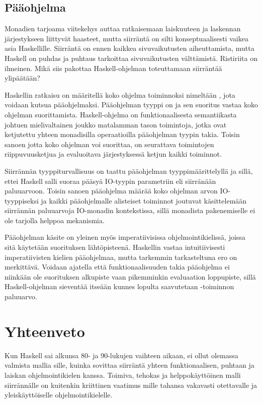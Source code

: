 \documentclass[finnish]{tktltiki2}
\begin{document}
\subsection{Pääohjelma} %

Monadien tarjoama viitekehys auttaa ratkaisemaan laiskuuteen ja laskennan järjestykseen liittyvät
haasteet, mutta siirräntä on silti konseptuaalisesti vaikea asia Haskellille. Siirräntä on ennen
kaikkea sivuvaikutusten aiheuttamista, mutta Haskell on puhdas ja puhtaus tarkoittaa sivuvaikutusten
välttämistä. Ristiriita on ilmeinen. Mikä siis pakottaa Haskell-ohjelman toteuttamaan siirräntää
ylipäätään?

Haskellin ratkaisu on määritellä koko ohjelma toiminnoksi nimeltään , jota voidaan kutsua
pääohjelmaksi. Pääohjelman tyyppi on  ja sen suoritus vastaa koko ohjelman
suorittamista. Haskell-ohjelma on funktionaalisesta semantiikasta johtuen mielivaltainen joukko
matalamman tason toimintoja, jotka ovat ketjutettu yhteen monadisilla operaatioilla pääohjelman
tyypin takia. Toisin sanoen jotta koko ohjelman voi suorittaa, on seurattava toimintojen
riippuvuusketjua ja evaluoitava järjestyksessä ketjun kaikki toiminnot.

Siirrännän tyyppiturvallisuus on taattu pääohjelman tyyppimäärittelyllä ja sillä, ettei Haskell
salli suoraa pääsyä IO-tyypin parametriin eli siirränään paluuarvoon. Toisin sanoen pääohjelma
määrää koko ohjelman arvon IO-tyyppiseksi ja kaikki pääohjelmalle alisteiset toiminnot joutuvat
käsittelemään siirrännän paluuarvoja IO-monadin kontekstissa, sillä monadista pakenemiselle ei ole
tarjolla helppoa mekanismia.

Pääohjelman käsite on yleinen myös imperatiivisissa ohjelmointikielissä, joissa sitä käytetään
suorituksen lähtöpisteenä. Haskellin  vastaa intuitiivisesti imperatiivisten kielien
pääohjelmaa, mutta tarkemmin tarkasteltuna ero on merkittävä. Voidaan ajatella että
funktionaalisuuden takia pääohjelma ei niinkään ole suorituksen alkupiste vaan pikemminkin
evaluaation loppupiste, sillä Haskell-ohjelman sieventää itseään kunnes lopulta saavutetaan
-toiminnon paluuarvo.


\section{Yhteenveto}

Kun Haskell sai alkunsa 80- ja 90-lukujen vaihteen aikaan, ei ollut olemassa valmista mallia sille,
kuinka sovittaa siirräntä yhteen funktionaalisen, puhtaan ja laiskan ohjelmointikielen kanssa.
Toimiva, tehokas ja helppokäyttöinen malli siirrännälle on kuitenkin kriittinen vaatimus mille
tahansa vakavasti otettavalle ja yleiskäyttöiselle ohjelmointikielelle.
\end{document}

